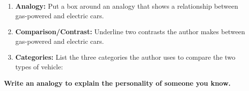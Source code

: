 \documentclass[12pt]{article}
\begin{document}
\begin{tcolorbox}[colframe=black!60, colback=white, 
coltitle=black, colbacktitle=black!15, fonttitle=\bfseries\Large, 
title=Independent Practice, halign title=center, left=10pt, right=10pt, top=10pt, bottom=15pt]

\vspace{0.5cm}

\begin{enumerate}[itemsep=1em]
    \item \textbf{Analogy:} Put a box around an analogy that shows a relationship between gas-powered and electric cars. 

    \item \textbf{Comparison/Contrast:} Underline two contrasts the author makes between gas-powered and electric cars. 

\item \textbf{Categories:} List the three categories the author uses to compare the two types of vehicle:
\vspace{2cm}
        
\end{enumerate}

\end{tcolorbox}

\vspace{1em}
\begin{tcolorbox}[colframe=black!60, colback=white, 
coltitle=black, colbacktitle=black!15, fonttitle=\bfseries\Large, 
title=Exit Ticket, halign title=center, left=10pt, right=10pt, top=5pt, bottom=15pt]
\textbf{Write an analogy to explain the personality of someone you know.}
\vspace{6em}

\end{tcolorbox}
\end{document}
